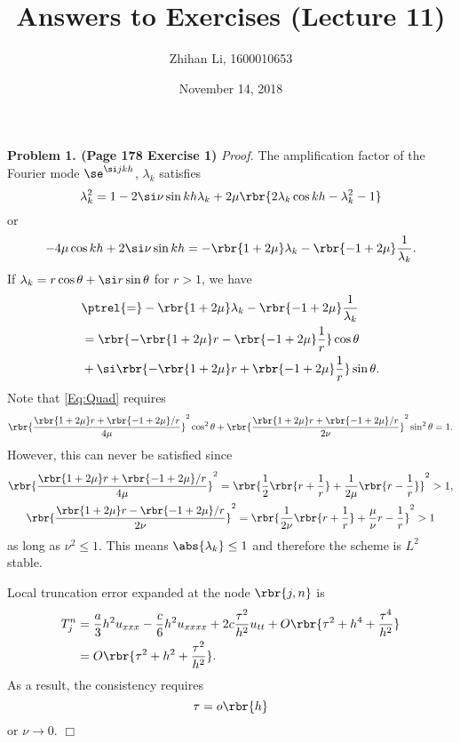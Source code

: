 \documentclass[english, nochinese]{pnote}
\title{Answers to Exercises (Lecture 11)}
\author{Zhihan Li, 1600010653}
\date{November 14, 2018}
\begin{document}
\maketitle

\textbf{Problem 1. (Page 178 Exercise 1)} \textit{Proof.} The amplification factor of the Fourier mode $ \se^{ \si j k h } $, $\lambda_k$ satisfies
\begin{equation}
\lambda_k^2 = 1 - 2 \si \nu \sin k h \lambda_k + 2 \mu \rbr{ 2 \lambda_k \cos k h - \lambda_k^2 - 1 }
\end{equation}
or
\begin{equation} \label{Eq:Quad}
- 4 \mu \cos k h + 2 \si \nu \sin k h = -\rbr{ 1 + 2 \mu } \lambda_k - \rbr{ -1 + 2 \mu } \frac{1}{\lambda_k}.
\end{equation}
If $ \lambda_k = r \cos \theta + \si r \sin \theta $ for $ r > 1 $, we have
\begin{equation}
\begin{split}
&\ptrel{=} - \rbr{ 1 + 2 \mu } \lambda_k - \rbr{ -1 + 2 \mu } \frac{1}{\lambda_k} \\
&= \rbr{ -\rbr{ 1 + 2 \mu } r - \rbr{ -1 + 2 \mu } \frac{1}{r} } \cos \theta \\
&+ \si \rbr{ -\rbr{ 1 + 2 \mu } r + \rbr{ -1 + 2 \mu } \frac{1}{r} } \sin \theta.
\end{split}
\end{equation}
Note that \eqref{Eq:Quad} requires
\begin{equation}
\rbr{\frac{ \rbr{ 1 + 2 \mu } r + \rbr{ -1 + 2 \mu } / r }{ 4 \mu }}^2 \cos^2 \theta + \rbr{\frac{ \rbr{ 1 + 2 \mu } r + \rbr{ -1 + 2 \mu } / r }{ 2 \nu }}^2 \sin^2 \theta = 1.
\end{equation}
However, this can never be satisfied since
\begin{gather}
\rbr{\frac{ \rbr{ 1 + 2 \mu } r + \rbr{ -1 + 2 \mu } / r }{ 4 \mu }}^2 = \rbr{ \frac{1}{2} \rbr{ r + \frac{1}{r} } + \frac{1}{ 2 \mu } \rbr{ r - \frac{1}{r} } }^2 > 1, \\
\rbr{\frac{ \rbr{ 1 + 2 \mu } r - \rbr{ -1 + 2 \mu } / r }{ 2 \nu }}^2 = \rbr{ \frac{1}{ 2 \nu } \rbr{ r + \frac{1}{r} } + \frac{\mu}{\nu}{ r - \frac{1}{r} } }^2 > 1
\end{gather}
as long as $ \nu^2 \le 1 $. This means $ \abs{\lambda_k} \le 1 $ and therefore the scheme is $L^2$ stable.

Local truncation error expanded at the node $ \rbr{ j, n } $ is
\begin{equation}
\begin{split}
T_j^n &= \frac{a}{3} h^2 u_{ x x x } - \frac{c}{6} h^2 u_{ x x x x } + 2 c \frac{\tau^2}{h^2} u_{ t t } + O \rbr{ \tau^2 + h^4 + \frac{\tau^4}{h^2} } \\
&= O \rbr{ \tau^2 + h^2 + \frac{\tau^2}{h^2} }.
\end{split}
\end{equation}
As a result, the consistency requires
\begin{equation}
\tau = o \rbr{h}
\end{equation}
or $ \nu \rightarrow 0 $.
\hfill$\Box$
\end{document}
